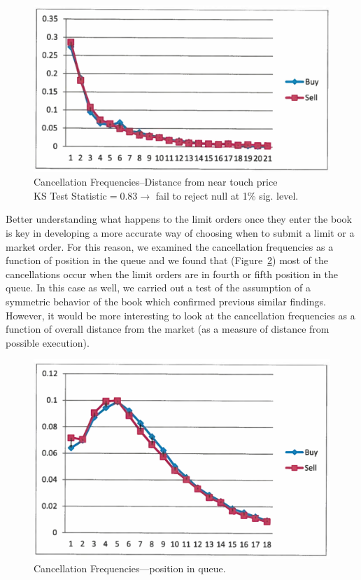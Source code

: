 	\begin{figure}[!ht]
   	\centering
   	\includegraphics[width=\textwidth]{chapters/chapter_trade_data_models/figures/canfreqnear.png} 
   	\caption{Cancellation Frequencies--Distance from near touch price \\ KS Test Statistic$=0.83\to$ fail to reject null at 1\% sig. level.\label{fig:canfreqnear}}
	\end{figure}


Better understanding what happens to the limit orders once they enter the book is key in developing a more accurate way of choosing when to submit a limit or a market order. For this reason, we examined the cancellation frequencies as a function of position in the queue and we found that (Figure~\ref{fig:canfreq}) most of the cancellations occur when the limit orders are in fourth or fifth position in the queue. In this case as well, we carried out a test of the assumption of a symmetric behavior of the book which confirmed previous similar findings. However, it would be more interesting to look at the cancellation frequencies as a function of overall distance from the market (as a measure of distance from possible execution). 
	\begin{figure}[!ht]
   	\centering
   	\includegraphics[width=\textwidth]{chapters/chapter_trade_data_models/figures/canfreq.png} 
   	\caption{Cancellation Frequencies---position in queue.\label{fig:canfreq}}
	\end{figure}


